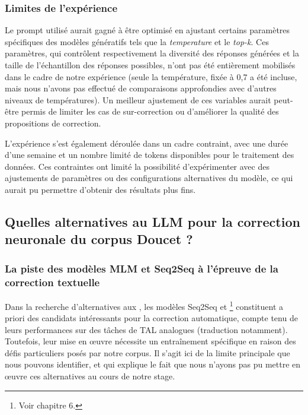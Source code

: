 \subsubsection{Limites de l’expérience}
\newline

Le prompt utilisé aurait gagné à être optimisé en ajustant certains paramètres spécifiques des modèles génératifs tels que la \textit{temperature} et le \textit{top-k}. Ces paramètres, qui contrôlent respectivement la diversité des réponses générées et la taille de l’échantillon des réponses possibles, n’ont pas été entièrement mobilisés dans le cadre de notre expérience (seule la température, fixée à 0,7 a été incluse, mais nous n’avons pas effectué de comparaisons approfondies avec d’autres niveaux de températures). Un meilleur ajustement de ces variables aurait peut-être permis de limiter les cas de sur-correction ou d’améliorer la qualité des propositions de correction.

\newline

L’expérience s’est également déroulée dans un cadre contraint, avec une durée d’une semaine et un nombre limité de tokens disponibles pour le traitement des données. Ces contraintes ont limité la possibilité d’expérimenter avec des ajustements de paramètres ou des configurations alternatives du modèle, ce qui aurait pu permettre d'obtenir des résultats plus fins.

\subsection{Quelles alternatives au LLM pour la correction neuronale du corpus Doucet ?}

\subsubsection{La piste des modèles MLM et Seq2Seq à l’épreuve de la correction textuelle}

Dans la recherche d'alternatives aux \llm, les modèles Seq2Seq et \mlm\footnote{Voir chapitre 6.} constituent a priori des candidats intéressants pour la correction automatique, compte tenu de leurs performances sur des tâches de TAL analogues (traduction notamment). Toutefois, leur mise en œuvre nécessite un entraînement spécifique en raison des défis particuliers posés par notre corpus. Il s’agit ici de la limite principale que nous pouvons identifier, et qui explique le fait que nous n’ayons pas pu mettre en œuvre ces alternatives au cours de notre stage.

